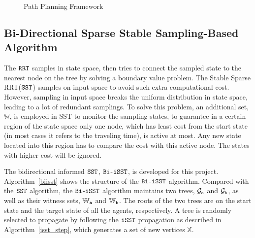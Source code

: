\documentclass[conference, onecolumn]{IEEEtran}
\begin{document}
\begin{figure}[h]
	\centering
	\captionsetup{justification=centering}
	\caption{Path Planning Framework}
	\label{fig:framework}
\end{figure}
\subsection{Bi-Directional Sparse Stable Sampling-Based Algorithm}
The $\tt RRT$ samples in state space, then tries to connect the sampled state to the nearest node on the tree by solving a boundary value problem. The Stable Sparse RRT($\tt SST$)\cite{sst} samples on input space to avoid such extra computational cost. However, sampling in input space breaks the uniform distribution in state space, leading to a lot of redundant samplings. To solve this problem, an additional set, $\mathbb{W}$, is employed in SST to monitor the sampling states, to guarantee in a certain region of the state space only one node, which has least cost from the start state (in most cases it refers to the traveling time), is active at most. Any new state located into this region has to compare the cost with this active node. The states with higher cost will be ignored. 

The bidirectional informed $\tt SST$, ${{\tt Bi}}$-${{\tt iSST}}$, is developed for this project. Algorithm~\ref{biisst} shows the structure of the ${{\tt Bi}}$-${{\tt iSST}}$ algorithm. Compared with the ${{\tt SST}}$ algorithm, the ${{\tt Bi}}$-${{\tt iSST}}$ algorithm maintains two trees, $\mathcal{G}_{\tt a} $ and $ \mathcal{G}_{\tt b} $, as well as their witness sets, $\mathbb{W}_{\tt a} $ and $ \mathbb{W}_{\tt b} $. The roots of the two trees are on the start state and the target state of all the agents, respectively. A tree is randomly selected to propagate by following the $\tt iSST$ propagation as described in Algorithm~\ref{isst_step}, which generates a set of new vertices $\mathbb{X}$.
\end{document}
